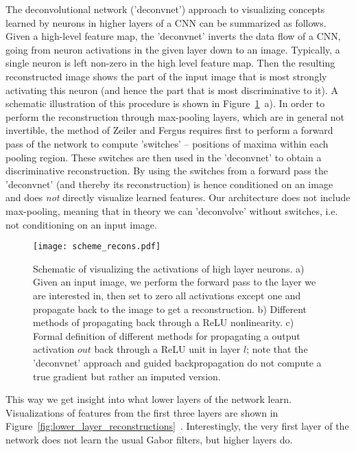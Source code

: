 \documentclass{article} \usepackage{iclr2015,times}
\begin{document}
The deconvolutional network ('deconvnet') approach to visualizing concepts learned by neurons in higher layers of a CNN can be summarized as follows. Given a high-level feature map, the 'deconvnet' inverts the data flow of a CNN, going from neuron activations in the given layer down to an image. Typically, a single neuron is left non-zero in the high level feature map. Then the resulting reconstructed image shows the part of the input image that is most strongly activating this neuron (and hence the part that is most discriminative to it). A schematic illustration of this procedure is shown in Figure~\ref{fig:scheme_deconv}~a).
In order to perform the reconstruction through max-pooling layers, which are in general not invertible, the method of Zeiler and Fergus requires first to perform a forward pass of the network to compute 'switches' -- positions of maxima within each pooling region. These switches are then used in the 'deconvnet' to obtain a discriminative reconstruction. By using the switches from a forward pass the 'deconvnet' (and thereby its reconstruction) is hence conditioned on an image and does \emph{not} directly visualize learned features. Our architecture does not include max-pooling, meaning that in theory we can 'deconvolve' without switches, i.e. not conditioning on an input image. 
\begin{figure}[h!]
\begin{center}
\texttt{[image: scheme\_recons.pdf]}
\end{center}
\caption{Schematic of visualizing the activations of high layer
  neurons. a) Given an input image, we perform the forward pass to the
  layer we are interested in, then set to zero all activations except
  one and propagate back to the image to get a reconstruction. b)
  Different methods of propagating back through a ReLU
  nonlinearity. c) Formal definition of different methods for
  propagating a output activation $out$ back through a ReLU unit in
  layer $l$; note that the 'deconvnet' approach and guided backpropagation 
  do not compute a true gradient but rather an imputed version.}
\label{fig:scheme_deconv}
\end{figure}This way we get insight into what lower layers of the network learn. Visualizations of features from the first three layers are shown in Figure~\ref{fig:lower_layer_reconstructions}~. Interestingly, the very first layer of the network does not learn the usual Gabor filters, but higher layers do. 
\end{document}
